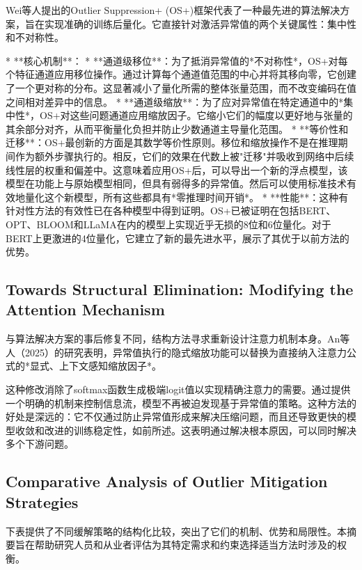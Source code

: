 \documentclass{article}
\begin{document}
Wei等人\cite{wei2023outlier}提出的Outlier Suppression+ (OS+)框架代表了一种最先进的算法解决方案，旨在实现准确的训练后量化。它直接针对激活异常值的两个关键属性：集中性和不对称性。

* **核心机制**：
  * **通道级移位**：为了抵消异常值的*不对称性*，OS+对每个特征通道应用移位操作。通过计算每个通道值范围的中心并将其移向零，它创建了一个更对称的分布。这显著减小了量化所需的整体张量范围，而不改变编码在值之间相对差异中的信息。
  * **通道级缩放**：为了应对异常值在特定通道中的*集中性*，OS+对这些问题通道应用缩放因子。它缩小它们的幅度以更好地与张量的其余部分对齐，从而平衡量化负担并防止少数通道主导量化范围。
* **等价性和迁移**：OS+最创新的方面是其数学等价性原则。移位和缩放操作不是在推理期间作为额外步骤执行的。相反，它们的效果在代数上被"迁移"并吸收到网络中后续线性层的权重和偏差中。这意味着应用OS+后，可以导出一个新的浮点模型，该模型在功能上与原始模型相同，但具有弱得多的异常值。然后可以使用标准技术有效地量化这个新模型，所有这些都具有*零推理时间开销*。
* **性能**：这种有针对性方法的有效性已在各种模型中得到证明。OS+已被证明在包括BERT、OPT、BLOOM和LLaMA在内的模型上实现近乎无损的8位和6位量化。对于BERT上更激进的4位量化，它建立了新的最先进水平，展示了其优于以前方法的优势。

\subsection{Towards Structural Elimination: Modifying the Attention Mechanism}

与算法解决方案的事后修复不同，结构方法寻求重新设计注意力机制本身。An等人（2025）的研究表明，异常值执行的隐式缩放功能可以替换为直接纳入注意力公式的*显式、上下文感知缩放因子*。

这种修改消除了softmax函数生成极端logit值以实现精确注意力的需要。通过提供一个明确的机制来控制信息流，模型不再被迫发现基于异常值的策略。这种方法的好处是深远的：它不仅通过防止异常值形成来解决压缩问题，而且还导致更快的模型收敛和改进的训练稳定性，如前所述。这表明通过解决根本原因，可以同时解决多个下游问题。

\subsection{Comparative Analysis of Outlier Mitigation Strategies}

下表提供了不同缓解策略的结构化比较，突出了它们的机制、优势和局限性。本摘要旨在帮助研究人员和从业者评估为其特定需求和约束选择适当方法时涉及的权衡。
\end{document}
